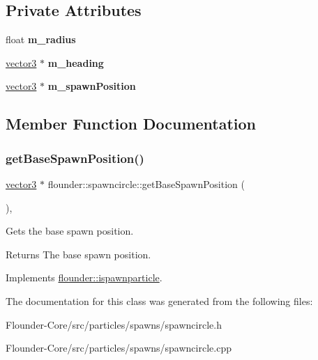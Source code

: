 \subsection*{Private Attributes}
\begin{DoxyCompactItemize}
\item 
\mbox{\label{classflounder_1_1spawncircle_a2ac7586e8089613b867e066debdcd2f5}} 
float {\bfseries m\+\_\+radius}
\item 
\mbox{\label{classflounder_1_1spawncircle_aaf535db2cadb362377402b85684d693c}} 
\hyperlink{classflounder_1_1vector3}{vector3} $\ast$ {\bfseries m\+\_\+heading}
\item 
\mbox{\label{classflounder_1_1spawncircle_a19d5361c716ed47740195682e29d06f1}} 
\hyperlink{classflounder_1_1vector3}{vector3} $\ast$ {\bfseries m\+\_\+spawn\+Position}
\end{DoxyCompactItemize}


\subsection{Member Function Documentation}
\mbox{\label{classflounder_1_1spawncircle_a1a637319942ae68475e7b0b0f3e0a739}} 
\subsubsection{\texorpdfstring{get\+Base\+Spawn\+Position()}{getBaseSpawnPosition()}}
{\footnotesize\ttfamily \hyperlink{classflounder_1_1vector3}{vector3} $\ast$ flounder\+::spawncircle\+::get\+Base\+Spawn\+Position (\begin{DoxyParamCaption}{ }\end{DoxyParamCaption})\hspace{0.3cm}{\ttfamily [override]}, {\ttfamily [virtual]}}



Gets the base spawn position. 

\begin{DoxyReturn}{Returns}
The base spawn position. 
\end{DoxyReturn}


Implements \hyperlink{classflounder_1_1ispawnparticle_a3e59019906bbb5ba8df82a4f6e847ef6}{flounder\+::ispawnparticle}.



The documentation for this class was generated from the following files\+:\begin{DoxyCompactItemize}
\item 
Flounder-\/\+Core/src/particles/spawns/spawncircle.\+h\item 
Flounder-\/\+Core/src/particles/spawns/spawncircle.\+cpp\end{DoxyCompactItemize}
